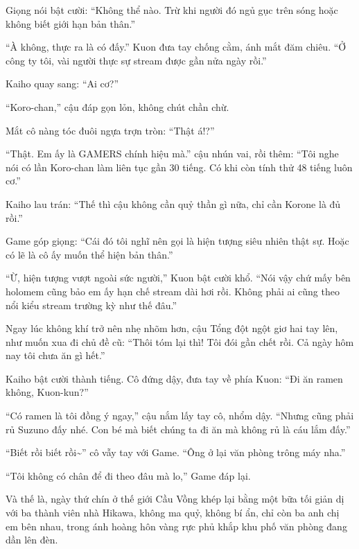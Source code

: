 \documentclass[../main.tex]{subfiles}
\begin{document}
Giọng nói bật cười: ``Không thể nào. Trừ khi người đó ngủ gục trên sóng hoặc không biết giới hạn bản thân.''

``À không, thực ra là có đấy.'' Kuon đưa tay chống cằm, ánh mắt đăm chiêu. ``Ở công ty tôi, vài người thực sự stream được gần nửa ngày rồi.''

Kaiho quay sang: ``Ai cơ?''

``Koro-chan,'' cậu đáp gọn lỏn, không chút chần chừ.

Mắt cô nàng tóc đuôi ngựa trợn tròn: ``Thật á!?''

``Thật. Em ấy là GAMERS chính hiệu mà.'' cậu nhún vai, rồi thêm: ``Tôi nghe nói có lần Koro-chan làm liên tục gần 30 tiếng. Có khi còn tính thử 48 tiếng luôn cơ.''

Kaiho lau trán: ``Thế thì cậu không cần quỷ thần gì nữa, chỉ cần Korone là đủ rồi.''

Game góp giọng: ``Cái đó tôi nghĩ nên gọi là hiện tượng siêu nhiên thật sự. Hoặc có lẽ là cô ấy muốn thể hiện bản thân.''

``Ừ, hiện tượng vượt ngoài sức người,'' Kuon bật cười khổ. ``Nói vậy chứ mấy bên holomem cũng bảo em ấy hạn chế stream dài hơi rồi. Không phải ai cũng theo nổi kiểu stream trường kỳ như thế đâu.''

Ngay lúc không khí trở nên nhẹ nhõm hơn, cậu Tổng đột ngột giơ hai tay lên, như muốn xua đi chủ đề cũ: ``Thôi tóm lại thì! Tôi đói gần chết rồi. Cả ngày hôm nay tôi chưa ăn gì hết.''

Kaiho bật cười thành tiếng. Cô đứng dậy, đưa tay về phía Kuon: ``Đi ăn ramen không, Kuon-kun?''

``Có ramen là tôi đồng ý ngay,'' cậu nắm lấy tay cô, nhổm dậy. ``Nhưng cũng phải rủ Suzuno đấy nhé. Con bé mà biết chúng ta đi ăn mà không rủ là cáu lắm đấy.''

``Biết rồi biết rồi\~{}'' cô vẫy tay với Game. ``Ông ở lại văn phòng trông máy nha.''

``Tôi không có chân để đi theo đâu mà lo,'' Game đáp lại.

Và thế là, ngày thứ chín ở thế giới Cầu Vồng khép lại bằng một bữa tối giản dị với ba thành viên nhà Hikawa, không ma quỷ, không bí ẩn, chỉ còn ba anh chị em bên nhau, trong ánh hoàng hôn vàng rực phủ khắp khu phố văn phòng đang dần lên đèn.
\end{document}
